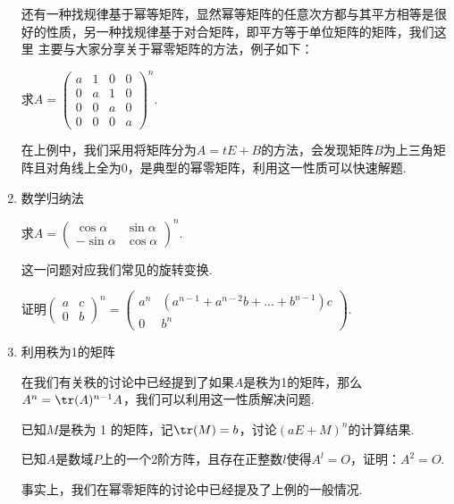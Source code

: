 \begin{enumerate}
    还有一种找规律基于幂等矩阵，显然幂等矩阵的任意次方都与其平方相等是很好的性质，另一种找规律基于对合矩阵，即平方等于单位矩阵的矩阵，我们这里
    主要与大家分享关于幂零矩阵的方法，例子如下：
    \begin{example}
        求$A=\begin{pmatrix}a & 1 & 0 & 0 \\ 0 & a & 1 & 0 \\ 0 & 0 & a & 0 \\ 0 & 0 & 0 & a \end{pmatrix}^n$.
    \end{example}
    在上例中，我们采用将矩阵分为$A=tE+B$的方法，会发现矩阵$B$为上三角矩阵且对角线上全为0，是典型的幂零矩阵，利用这一性质可以快速解题.
    \item 数学归纳法
    \begin{example}
        求$A=\begin{pmatrix}\cos\alpha & \sin\alpha \\ -\sin\alpha & \cos\alpha\end{pmatrix}^n$.
    \end{example}
    这一问题对应我们常见的旋转变换.
    \begin{example}
        证明$\begin{pmatrix}
            a & c \\ 0 & b
        \end{pmatrix}^n=\begin{pmatrix}
            a^n & (a^{n-1}+a^{n-2}b+\dots+b^{n-1})c \\ 0 & b^n
        \end{pmatrix}$.
    \end{example}
    \item 利用秩为1的矩阵

    在我们有关秩的讨论中已经提到了如果$A$是秩为1的矩阵，那么$A^n=\tr(A)^{n-1}A$，我们可以利用这一性质解决问题.
    \begin{example}
        已知$M$是秩为 1 的矩阵，记$\tr(M)=b$，讨论$(aE+M)^n$的计算结果.
    \end{example}

    \begin{example}
        已知$A$是数域$P$上的一个2阶方阵，且存在正整数$l$使得$A^l=O$，证明：$A^2=O$.
    \end{example}
    事实上，我们在幂零矩阵的讨论中已经提及了上例的一般情况.


\end{enumerate}
